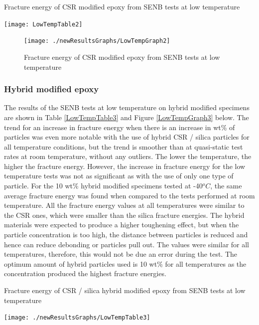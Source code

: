 \documentclass[numbers=noendperiod,chapterprefix=on]{icldt} %
\begin{document}
\begin{table}[!htpb]
\centering
\caption{Fracture energy of CSR modified epoxy from SENB tests at low temperature} \label{LowTempTable2}
\texttt{[image: LowTempTable2]}
\end{table}
\FloatBarrier

\begin{figure}[!htpb]
\centering
\texttt{[image: ./newResultsGraphs/LowTempGraph2]}
\caption{Fracture energy of CSR modified epoxy from SENB tests at low temperature}\label{LowTempGraph2}
\end{figure}
\FloatBarrier

\subsubsection{Hybrid modified epoxy}
The results of the SENB tests at low temperature on hybrid modified specimens are shown in Table \ref{LowTempTable3} and Figure \ref{LowTempGraph3} below.
The trend for an increase in fracture energy when there is an increase in wt\% of particles was even more notable with the use of hybrid CSR / silica particles for all temperature conditions, but the trend is smoother than at quasi-static test rates at room temperature, without any outliers. The lower the temperature, the higher the fracture energy. However, the increase in fracture energy for the low temperature tests was not as significant as with the use of only one type of particle. For the 10 wt\% hybrid modified specimens tested at -40$^oC$, the same average fracture energy was found when compared to the tests performed at room temperature.  All the fracture energy values at all temperatures were similar to the CSR ones, which were smaller than the silica fracture energies. The hybrid materials were expected to produce a higher toughening effect, but when the particle concentration is too high, the distance between particles is reduced and hence can reduce debonding or particles pull out. The values were similar for all temperatures, therefore, this would not be due an error during the test. The optimum amount of hybrid particles used is 10 wt\% for all temperatures as the concentration produced the highest fracture energies.


\begin{table}[!t]
\centering
\caption{Fracture energy of CSR / silica hybrid modified epoxy from SENB tests at low temperature} \label{LowTempTable3}
\texttt{[image: ./newResultsGraphs/LowTempTable3]}
\end{table}
\FloatBarrier
\end{document}
